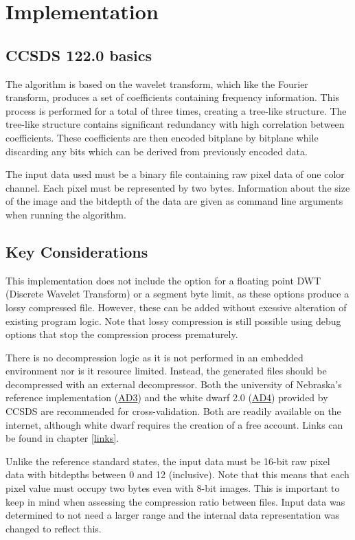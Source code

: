 \documentclass[12pt, a4paper]{article}
\begin{document}
\newpage
\section{Implementation}

\subsection{CCSDS 122.0 basics}
The algorithm is based on the wavelet transform, which like the Fourier transform, 
produces a set of coefficients containing frequency information. 
This process is performed for a total of three times, creating a tree-like structure. 
The tree-like structure contains significant redundancy with high correlation between coefficients. 
These coefficients are then encoded bitplane by bitplane while discarding any bits which can be derived from previously encoded data.

\medskip
\noindent
The input data used must be a binary file containing raw pixel data of one color channel. 
Each pixel must be represented by two bytes. 
Information about the size of the image and the bitdepth of the data are given as command line arguments when running the algorithm.

\subsection{Key Considerations}
This implementation does not include the option for a floating point 
DWT (Discrete Wavelet Transform) or a segment byte limit, 
as these options produce a lossy compressed file.
However, these can be added without exessive alteration of existing program logic.
Note that lossy compression is still possible using debug options that 
stop the compression process prematurely. 

\medskip
\noindent
There is no decompression logic as it is not performed in an embedded environment nor is it resource limited. 
Instead, the generated files should be decompressed with an external decompressor.
Both the university of Nebraska's reference implementation (\hyperref[lnk:uon]{AD3}) and 
the white dwarf 2.0 (\hyperref[lnk:wd]{AD4}) provided by CCSDS are 
recommended for cross-validation. Both are readily available on the internet, 
although white dwarf requires the creation of a free account. 
Links can be found in chapter \ref{links}.

\medskip
\noindent
Unlike the reference standard states, the input data must be 16-bit raw pixel data with bitdepths between 0 and 12 (inclusive). 
Note that this means that each pixel value must occupy two bytes even with 8-bit images. 
This is important to keep in mind when assessing the compression ratio between files. 
Input data was determined to not need a larger range and the internal data representation was changed to reflect this.
\end{document}
